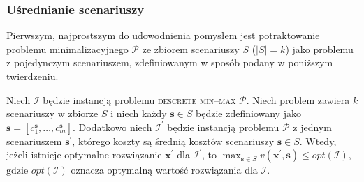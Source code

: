 \subsubsection{Uśrednianie scenariuszy}

Pierwszym, najprostszym do udowodnienia pomysłem jest potraktowanie problemu minimalizacyjnego $\mathcal{P}$ ze zbiorem scenariuszy $S$ ($\left| S \right| = k$) jako problemu z pojedynczym scenariuszem, zdefiniowanym w sposób podany w poniższym twierdzeniu.

\begin{theorem}\label{th:minmaxavg}
	Niech $\mathcal{I}$ będzie instancją problemu \textsc{descrete min--max $\mathcal{P}$}. Niech problem zawiera $k$ scenariuszy w zbiorze $S$ i niech każdy $\textbf{s} \in S$ będzie zdefiniowany jako $\textbf{s} = \left[ c^{\textbf{s}}_{1}, \dots, c^{\textbf{s}}_{m} \right]$. Dodatkowo niech $\mathcal{I^{\prime}}$ będzie instancją problemu $\mathcal{P}$ z jednym scenariuszem $\textbf{s}^{\prime}$, którego koszty są średnią kosztów scenariuszy $\textbf{s} \in S$. Wtedy, jeżeli istnieje optymalne rozwiązanie $\textbf{x}^{\prime}$ dla $\mathcal{I}^{\prime}$, to $\max_{\textbf{s} \in S} v \left( \textbf{x}^{\prime}, \textbf{s} \right) \leqslant opt \left( \mathcal{I} \right)$, gdzie $opt \left( \mathcal{I} \right)$ oznacza optymalną wartość rozwiązania dla $\mathcal{I}$.
\end{theorem}

